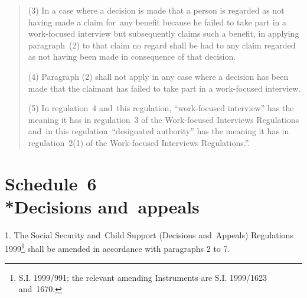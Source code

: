 \documentclass[12pt,a4paper]{article}
\begin{document}
\begin{quotation}
(3) In a case where a decision is made that a person is regarded as not having made a claim for~any benefit because he failed to take part in a work-focused interview but subsequently claims such a benefit, in applying paragraph~(2) to that claim no regard shall be had to any claim regarded as not having been made in consequence of that decision.

(4) Paragraph (2) shall not apply in any case where a decision has been made that the claimant has failed to take part in a work-focused interview.

(5) In regulation~4 and~this regulation, “work-focused interview” has the meaning it has in regulation~3 of the Work-focused Interviews Regulations and~in this regulation~“designated authority” has the meaning it has in regulation~2(1) of the Work-focused Interviews Regulations.”.
\end{quotation}

\part[Schedule~6 --- Decisions and~appeals]{Schedule~6\\*Decisions and~appeals}

\renewcommand\parthead{--- Schedule~6}

1.  The Social Security and~Child Support (Decisions and~Appeals) Regulations 1999\footnote{\frenchspacing S.I. 1999/991; the relevant amending Instruments are S.I. 1999/1623 and~1670.} shall be amended in accordance with paragraphs 2 to 7.

\medskip
\end{document}
